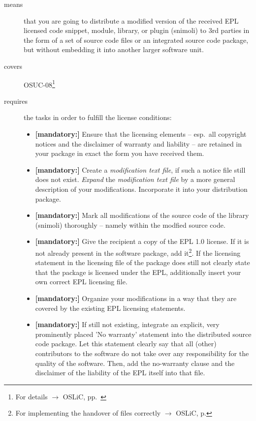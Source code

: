 \begin{description}
\item[means] that you are going to distribute a modified version of the received
EPL licensed code snippet, module, library, or plugin (snimoli) to 3rd
parties in the form of a set of source code files or an integrated source code
package, but without embedding it into another larger software unit.
\item[covers] OSUC-08\footnote{For details $\rightarrow$ OSLiC, pp.\ \pageref{OSUC-08-DEF}}
\item[requires] the tasks in order to fulfill the license conditions:
\begin{itemize}

  \item \textbf{[mandatory:]} Ensure that the licensing elements -- esp.\ all
  copyright notices and the disclaimer of warranty and liability -- are retained
  in your package in exact the form you have received them.

  \item \textbf{[mandatory:]} Create a \emph{modification text file}, if such a
  notice file still does not exist. \emph{Expand} the \emph{modification text
  file} by a more general description of your modifications. Incorporate it into
  your distribution package.

  \item \textbf{[mandatory:]} Mark all modifications of the source code of the
  library (snimoli) thoroughly -- namely within
  the modfied source code.
  
  \item \textbf{[mandatory:]} Give the recipient a copy of the EPL 1.0 license.
  If it is not already present in the software package, add it\footnote{For
  implementing the handover of files correctly $\rightarrow$ OSLiC, p.
  \pageref{DistributingFilesHint}}. If the licensing statement in the licensing
  file of the package does still not clearly state that the package is licensed
  under the EPL, additionally insert your own correct EPL licensing file.
  
  \item \textbf{[mandatory:]} Organize your modifications in a way that they are
  covered by the existing EPL licensing statements.
  
  \item \textbf{[mandatory:]} If still not existing, integrate an explicit, very
  prominently placed 'No warranty' statement into the distributed source code
  package. Let this statement clearly say that all (other) contributors to the
  software do not take over any responsibility for the quality of the software.
  Then, add the no-warranty clause and the disclaimer of the liability of the
  EPL itself into that file.
  

\end{itemize}
\end{description}
